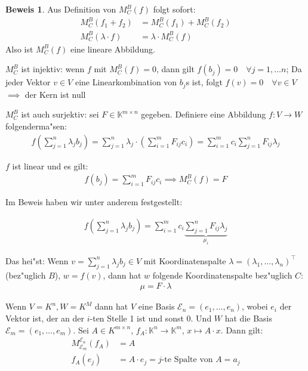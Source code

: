 \documentclass[fontsize=11pt,paper=a4,BCOR=0mm,DIV=11,automark,headsepline]{scrbook}
\theoremstyle{remark}
\theoremstyle{definition}
\theoremstyle{proof}
\newtheorem*{prof}{Beweis}
\theoremstyle{remark}
\begin{document}
\begin{prof}
Aus Definition von \(M_C^B(f)\) folgt sofort:
\begin{align*}
M^B_C(f_1 + f_2) &= M_C^B(f_1) + M_C^B(f_2)\\
M^B_C(\lambda\cdot f) &= \lambda\cdot M_C^B(f)
\end{align*}
Also ist \(M_C^B(f)\) eine lineare
Abbildung.

\(M_C^B\) ist injektiv: wenn \(f\) mit \(M^B_C(f) = 0\), dann gilt \(f(b_j) = 0\quad\forall j= 1,\dots n\); Da jeder Vektor \(v \in V\) eine Linearkombination von \(b_j\)s ist, folgt \(f(v) = 0 \quad\forall v \in V\) \(\implies\) der Kern ist null

\(M^B_C\) ist auch surjektiv: sei \(F\in \mathbb{K}^{m\times n}\) gegeben. Definiere eine Abbildung \(f: V\to W\) folgenderma"sen:
\begin{align*}
f\left(\sum_{j=1}^n\lambda_jb_j\right) = \sum_{j=1}^n\lambda_j\cdot\left(\sum_{i=1}^mF_{ij}c_i\right)=\sum_{i=1}^mc_i\sum_{j=1}^nF_{ij}\lambda_j
\end{align*}

\(f\) ist linear und es gilt:
\begin{align*}
f(b_j) = \sum_{i=1}^mF_{ij}c_i \implies M^B_C(f) = F
\end{align*}
\end{prof}

Im Beweis haben wir unter anderem festgestellt:
\begin{relation}
\begin{align*}
f\left(\sum_{j=1}^n\lambda_jb_j\right)=\sum_{i=1}^mc_i\underbrace{\sum_{j=1}^nF_{ij}\lambda_j}_{\mu_i}
\end{align*}

Das hei"st: Wenn \(v=\sum_{j=1}^n\lambda_jb_j\in V\) mit Koordinatenspalte \(\lambda = (\lambda_1,\dots,\lambda_n)^\top\) (bez"uglich \(B\)), \(w = f(v)\), dann hat \(w\) folgende Koordinatenspalte bez"uglich \(C\):
\begin{align}
\mu = F\cdot \lambda
\end{align}
\end{relation}

\begin{exa}
Wenn \(V=K^n, W=K^M\) dann hat \(V\) eine Basis \(\mathcal{E}_n = (e_1, \dots, e_n)\), wobei \(e_i\) der Vektor ist, der an der \(i\)-ten Stelle 1 ist und sonst 0. Und \(W\) hat die Basis \(\mathcal{E}_m = (e_1, \dots, e_m)\).
Sei \(A\in K^{m\times n }\), \(f_A: \mathbb{K}^n\to \mathbb{K}^m\), \(x \mapsto A\cdot x\). Dann gilt:
\begin{align*}
M^{\mathcal{E}_n}_{\mathcal{E}_m}(f_A) &= A\\
f_A(e_j) &= A\cdot e_j = j\text{-te Spalte von } A = a_j
\end{align*}
\end{exa}
\end{document}

